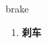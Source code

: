 
\begin{frame}
{\huge brake}
\begin{center}
\begin{enumerate}\Large
  \item \textbf{刹车}
\end{enumerate}
\end{center}
\end{frame}
